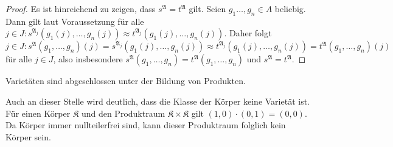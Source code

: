 \begin{proof}
    Es ist hinreichend zu zeigen, dass $s^\mathfrak{A}=t^\mathfrak{A}$ gilt. Seien $g_1\ldots,g_n\in A$ beliebig.
    Dann gilt laut Voraussetzung für alle $j\in J:s^{\mathfrak{A}_j}(g_1(j),\ldots,g_n(j))\approx t^{\mathfrak{A}_j}(g_1(j),\ldots,g_n(j))$.
    Daher folgt $j\in J:s^\mathfrak{A}(g_1,\ldots,g_n)(j)=s^{\mathfrak{A}_j}(g_1(j),\ldots,g_n(j))\approx t^{\mathfrak{A}_j}(g_1(j),\ldots,g_n(j))=t^\mathfrak{A}(g_1,\ldots,g_n)(j)$
    für alle $j\in J$, also insbesondere $s^\mathfrak{A}(g_1,\ldots,g_n)=t^\mathfrak{A}(g_1,\ldots,g_n)$ und $s^\mathfrak{A}=t^\mathfrak{A}.$
\end{proof}

\begin{corollary}
    Varietäten sind abgeschlossen unter der Bildung von Produkten.
\end{corollary}

\begin{remark}
    Auch an dieser Stelle wird deutlich, dass die Klasse der Körper keine Varietät ist. Für einen Körper $\mathfrak{K}$
    und den Produktraum $\mathfrak{K}\times \mathfrak{K}$ gilt $(1,0)\cdot (0,1)=(0,0)$. Da Körper immer nullteilerfrei sind,
    kann dieser Produktraum folglich kein Körper sein.

\end{remark}
